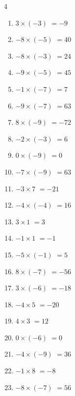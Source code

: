 \begin{multicols}{4}
\begin{enumerate}
  \item $3\times (-3)$
        $=-9$

  \item $-8\times (-5)$
        $=40$

  \item $-8\times (-3)$
        $=24$

  \item $-9\times (-5)$
        $=45$

  \item $-1\times (-7)$
        $=7$

  \item $-9\times (-7)$
        $=63$

  \item $8\times (-9)$
        $=-72$

  \item $-2\times (-3)$
        $=6$

  \item $0\times (-9)$
        $=0$

  \item $-7\times (-9)$
        $=63$

  \item $-3\times 7$
        $=-21$

  \item $-4\times (-4)$
        $=16$

  \item $3\times 1$
        $=3$

  \item $-1\times 1$
        $=-1$

  \item $-5\times (-1)$
        $=5$

  \item $8\times (-7)$
        $=-56$

  \item $3\times (-6)$
        $=-18$

  \item $-4\times 5$
        $=-20$

  \item $4\times 3$
        $=12$

  \item $0\times (-6)$
        $=0$

  \item $-4\times (-9)$
        $=36$

  \item $-1\times 8$
        $=-8$

  \item $-8\times (-7)$
        $=56$


\end{enumerate}
\end{multicols}
